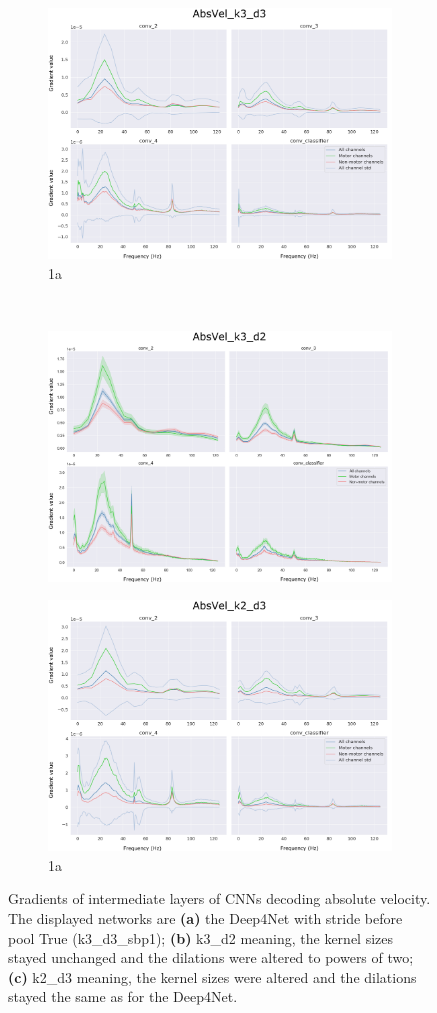 \begin{figure}
\begin{subfigure}{\textwidth}
  \centering
  \includegraphics[width=0.6\linewidth]{img/ch4/absVel-k3-d3}
  \caption{1a}
  \label{fig:absVel-k3-d3}
\end{subfigure}%
\\
\begin{subfigure}{\textwidth}
  \centering
  \includegraphics[width=0.6\linewidth]{img/ch4/absVel-k3-d2}
  \caption{}
  \label{fig:absVel-k3-d2}
\end{subfigure}
\begin{subfigure}{\textwidth}
  \centering
  \includegraphics[width=0.6\linewidth]{img/ch4/absVel-k2-d3}
  \caption{1a}
  \label{fig:absVel-k2-d3}
\end{subfigure}
\caption{Gradients of intermediate layers of CNNs decoding absolute velocity. The displayed networks are \textbf{(a)} the Deep4Net with stride before pool True (k3\_d3\_sbp1); \textbf{(b)} k3\_d2 meaning, the kernel sizes stayed unchanged and the dilations were altered to powers of two; \textbf{(c)} k2\_d3 meaning, the kernel sizes were altered and the dilations stayed the same as for the Deep4Net.}
\label{fig:gradient-peak}
\end{figure}

